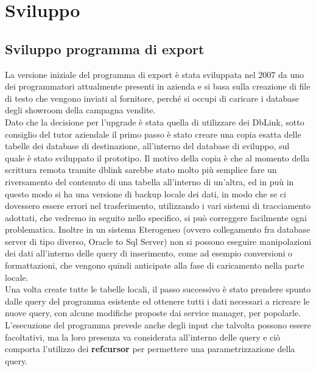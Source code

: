 \lstset{
showstringspaces=false
}
\section{Sviluppo}
\subsection{Sviluppo programma di export}
La versione iniziale del programma di export è stata sviluppata nel 2007 da uno dei programmatori attualmente presenti in azienda e si basa sulla creazione di file di testo che vengono inviati al fornitore, perché si occupi di caricare i database degli showroom della campagna vendite.\\
Dato che la decisione per l'upgrade è stata quella di utilizzare dei DbLink, sotto consiglio del tutor aziendale il primo passo è stato creare una copia esatta delle tabelle dei database di destinazione, all'interno del database di sviluppo, sul quale è stato sviluppato il prototipo. Il motivo della copia è che al momento della scrittura remota tramite dblink sarebbe stato molto più semplice fare un riversamento del contenuto di una tabella all'interno di un'altra, ed in puù in questo modo si ha una versione di backup locale dei dati, in modo che se ci dovessero essere errori nel trasferimento, utilizzando i vari sistemi di tracciamento adottati, che vedremo in seguito nello specifico, si può correggere facilmente ogni problematica. Inoltre in un sistema Eterogeneo (ovvero collegamento fra database server di tipo diverso, Oracle to Sql Server) non si possono eseguire manipolazioni dei dati all'interno delle query di inserimento, come ad esempio conversioni o formattazioni, che vengono quindi anticipate alla fase di caricamento nella parte locale.\\
Una volta create tutte le tabelle locali, il passo successivo è stato prendere spunto dalle query del programma esistente ed ottenere tutti i dati necessari a ricreare le nuove query, con alcune modifiche proposte dai service manager, per popolarle. L'esecuzione del programma prevede anche degli input che talvolta possono essere facoltativi, ma la loro presenza va considerata all'interno delle query e ciò comporta l'utilizzo dei \textbf{refcursor} per permettere una parametrizzazione della query.\\

